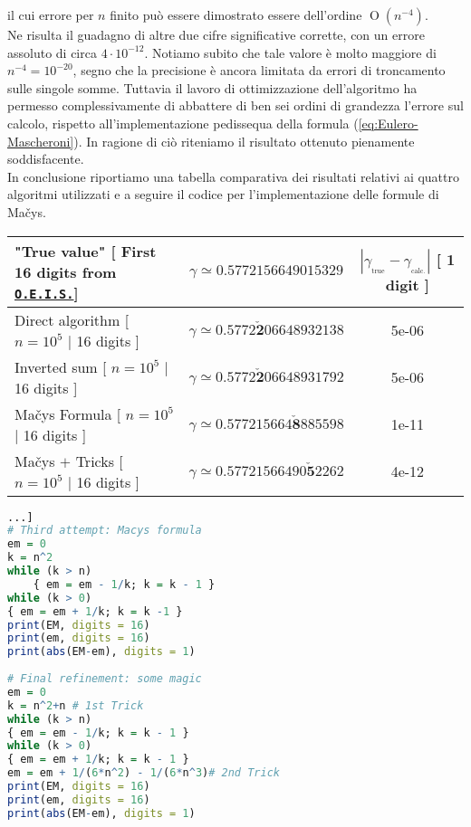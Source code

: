 \noindent il cui errore per $n$ finito può essere dimostrato essere dell'ordine $\mathop{O}(n^{-4})$.\\

\noindent Ne risulta il guadagno di altre due cifre significative corrette, con un errore assoluto di circa $4\cdot10^{-12}$. Notiamo subito che tale valore è molto maggiore di $n^{-4} = 10^{-20}$, segno che la precisione è ancora limitata da errori di troncamento sulle singole somme. Tuttavia il lavoro di ottimizzazione dell'algoritmo ha permesso complessivamente di abbattere di ben sei ordini di grandezza l'errore sul calcolo, rispetto all'implementazione pedissequa della formula (\ref{eq:Eulero-Mascheroni}). In ragione di ciò riteniamo il risultato ottenuto pienamente soddisfacente.\\

\noindent In conclusione riportiamo una tabella comparativa dei risultati relativi ai quattro algoritmi utilizzati e a seguire il codice per l'implementazione delle formule di Mačys.\\

\bgroup
\def\arraystretch{2}
\begin{center}
	\begin{tabular}{l||c|c}
		"True value" [ First 16 digits from \href{https://oeis.org/A001620}{\texttt{O.E.I.S.}}] &$\gamma \simeq 0.5772156649015329$  &$|\gamma_{_\mathrm{true}}  - \gamma_{_\mathrm{calc.}} |$ [ 1 digit ]\\  \hline
		Direct algorithm [ $n=10^5$ | 16 digits ]&$\gamma \simeq 0.5772\mathbf{\check{2}}06648932138$ & 5e-06 \\ 
		Inverted sum [ $n=10^5$ | 16 digits ]&$\gamma \simeq0.5772\mathbf{\check{2}}06648931792$ & 5e-06\\ 
		Mačys Formula [ $n=10^5$ | 16 digits ]&$\gamma\simeq0.577215664\mathbf{\check{8}}885598$ & 1e-11\\
		Mačys $+$ Tricks [ $n=10^5$ | 16 digits ]&$\gamma\simeq0.57721566490\mathbf{\check{5}}2262$ & 4e-12\\
	\end{tabular}
\end{center}
\egroup

\bigskip

\begin{lstlisting}[language=R, style=Rstyle, caption= \texttt{R} code for efficient computation of Eulero-Mascheroni constant, xleftmargin=.02\textwidth]
...]
# Third attempt: Macys formula
em = 0
k = n^2
while (k > n)
	{ em = em - 1/k; k = k - 1 }
while (k > 0)
{ em = em + 1/k; k = k -1 }
print(EM, digits = 16)
print(em, digits = 16)
print(abs(EM-em), digits = 1)
	
# Final refinement: some magic
em = 0
k = n^2+n # 1st Trick
while (k > n)
{ em = em - 1/k; k = k - 1 }
while (k > 0)
{ em = em + 1/k; k = k - 1 }
em = em + 1/(6*n^2) - 1/(6*n^3)# 2nd Trick
print(EM, digits = 16)
print(em, digits = 16)
print(abs(EM-em), digits = 1)
\end{lstlisting}

\newpage
